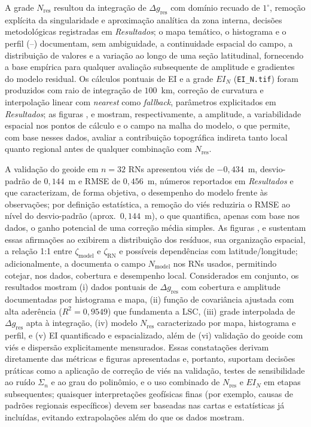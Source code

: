 A grade $N_{\text{res}}$ resultou da integração de $\Delta g_{\text{res}}$ com domínio recuado de $1^\circ$, remoção explícita da singularidade e aproximação analítica da zona interna, decisões metodológicas registradas em \emph{Resultados}; o mapa temático, o histograma e o perfil (–) documentam, sem ambiguidade, a continuidade espacial do campo, a distribuição de valores e a variação ao longo de uma seção latitudinal, fornecendo a base empírica para qualquer avaliação subsequente de amplitude e gradientes do modelo residual. Os cálculos pontuais de EI e a grade $EI_N$ (\texttt{EI\_N.tif}) foram produzidos com raio de integração de $100$~km, correção de curvatura e interpolação linear com \emph{nearest} como \emph{fallback}, parâmetros explicitados em \emph{Resultados}; as figuras ,  e  mostram, respectivamente, a amplitude, a variabilidade espacial nos pontos de cálculo e o campo na malha do modelo, o que permite, com base nesses dados, avaliar a contribuição topográfica indireta tanto local quanto regional antes de qualquer combinação com $N_{\text{res}}$.


A validação do geoide em $n=32$ RNs apresentou viés de $-0{,}434$~m, desvio-padrão de $0{,}144$~m e RMSE de $0{,}456$~m, números reportados em \emph{Resultados} e que caracterizam, de forma objetiva, o desempenho do modelo frente às observações; por definição estatística, a remoção do viés reduziria o RMSE ao nível do desvio-padrão (aprox.\ $0{,}144$~m), o que quantifica, apenas com base nos dados, o ganho potencial de uma correção média simples. As figuras ,  e  sustentam essas afirmações ao exibirem a distribuição dos resíduos, sua organização espacial, a relação 1:1 entre $\zeta_{\text{model}}$ e $\zeta_{\text{RN}}$ e possíveis dependências com latitude/longitude; adicionalmente, a  documenta o campo $N_{\text{model}}$ nos RNs usados, permitindo cotejar, nos dados, cobertura e desempenho local. Considerados em conjunto, os resultados mostram (i) dados pontuais de $\Delta g_{\text{res}}$ com cobertura e amplitude documentadas por histograma e mapa, (ii) função de covariância ajustada com alta aderência ($R^{2}=0{,}9549$) que fundamenta a LSC, (iii) grade interpolada de $\Delta g_{\text{res}}$ apta à integração, (iv) modelo $N_{\text{res}}$ caracterizado por mapa, histograma e perfil, e (v) EI quantificado e espacializado, além de (vi) validação do geoide com viés e dispersão explicitamente mensurados. Essas constatações derivam diretamente das métricas e figuras apresentadas e, portanto, suportam decisões práticas como a aplicação de correção de viés na validação, testes de sensibilidade ao ruído $\Sigma_n$ e ao grau do polinômio, e o uso combinado de $N_{\text{res}}$ e $EI_N$ em etapas subsequentes; quaisquer interpretações geofísicas finas (por exemplo, causas de padrões regionais específicos) devem ser baseadas nas cartas e estatísticas já incluídas, evitando extrapolações além do que os dados mostram.

